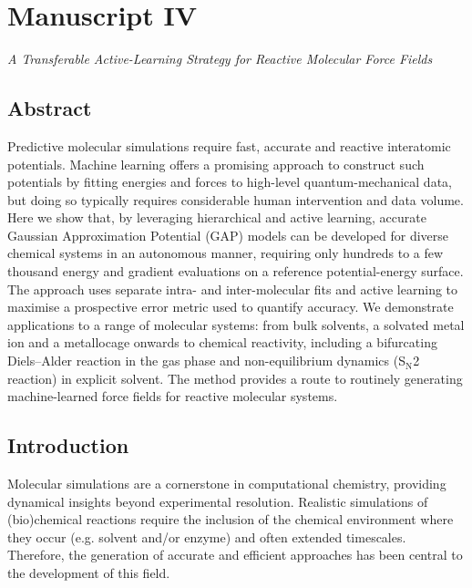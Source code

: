 \documentclass[../../main.tex]{subfiles}
\begin{document}
\vspace{-0.2cm}
\section{Manuscript IV}
{{\emph{A Transferable Active-Learning Strategy for Reactive Molecular Force Fields}}}

\subsection{Abstract}

Predictive molecular simulations require fast, accurate and reactive interatomic potentials. Machine learning offers a promising approach to construct such potentials by fitting energies and forces to high-level quantum-mechanical data, but doing so typically requires considerable human intervention and data volume. Here we show that, by leveraging hierarchical and active learning, accurate Gaussian Approximation Potential (GAP) models can be developed for diverse chemical systems in an autonomous manner, requiring only hundreds to a few thousand energy and gradient evaluations on a reference potential-energy surface. The approach uses separate intra- and inter-molecular fits and active learning to maximise a prospective error metric used to quantify accuracy. We demonstrate applications to a range of molecular systems: from bulk solvents, a solvated metal ion and a metallocage onwards to chemical reactivity, including a bifurcating Diels–Alder reaction in the gas phase and non-equilibrium dynamics (S${}_\text{N}$2 reaction) in explicit solvent. The method provides a route to routinely generating machine-learned force fields for reactive molecular systems. 


\subsection{Introduction}

Molecular simulations are a cornerstone in computational chemistry, providing dynamical insights beyond experimental resolution.\cite{Frenkel2002} Realistic simulations of (bio)chemical reactions require the inclusion of the chemical environment where they occur (e.g. solvent and/or enzyme) and often extended timescales. Therefore, the generation of accurate and efficient approaches has been central to the development of this field.
\end{document}
